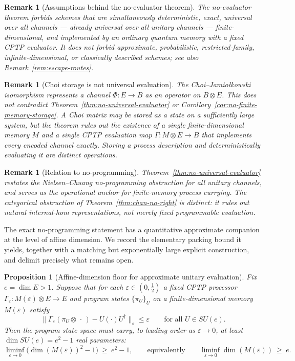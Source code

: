 \documentclass[11pt]{article}
\newtheorem{proposition}[theorem]{Proposition}
\newtheorem{remark}[theorem]{Remark}
\begin{document}
\begin{remark}[Assumptions behind the no-evaluator theorem]
\label{rem:assumptions-no-evaluator}
The no-evaluator theorem forbids schemes that are simultaneously
deterministic, exact, universal over all channels --- already universal over
all unitary channels --- finite-dimensional, and implemented by an ordinary
quantum memory with a fixed CPTP evaluator. It does not forbid approximate,
probabilistic, restricted-family, infinite-dimensional, or classically
described schemes; see also Remark~\ref{rem:escape-routes}.
\end{remark}

\begin{remark}[Choi storage is not universal evaluation]
\label{rem:choi-not-evaluation}
The Choi--Jamio\l{}kowski isomorphism represents a channel $\Phi:E\to B$ as
an operator on $B\otimes E$. This does not contradict
Theorem~\ref{thm:no-universal-evaluator} or
Corollary~\ref{cor:no-finite-memory-storage}. A Choi matrix may be stored as
a state on a sufficiently large system, but the theorem rules out the
existence of a single finite-dimensional memory $M$ and a single CPTP
evaluation map $\Gamma:M\otimes E\to B$ that implements every encoded channel
exactly. Storing a process description and deterministically evaluating it
are distinct operations.
\end{remark}

\begin{remark}[Relation to no-programming]
\label{rem:no-programming}
Theorem~\ref{thm:no-universal-evaluator} restates the
Nielsen--Chuang no-programming obstruction
\cite{NielsenChuang1997} for all unitary channels, and serves as
the operational anchor for finite-memory process currying. The categorical
obstruction of Theorem~\ref{thm:chan-no-right} is distinct: it rules out
natural internal-hom representations, not merely fixed programmable
evaluation.
\end{remark}

The exact no-programming statement has a quantitative approximate companion at
the level of affine dimension. We record the elementary packing bound it yields,
together with a matching but exponentially large explicit construction, and
delimit precisely what remains open.

\begin{proposition}[Affine-dimension floor for approximate unitary evaluation]
\label{prop:approx-memory-floor}
Fix $e=\dim E>1$. Suppose that for each $\varepsilon\in(0,\tfrac12)$ a fixed
CPTP processor $\Gamma_\varepsilon:M(\varepsilon)\otimes E\to E$ and program
states $\{\pi_U\}_{U}$ on a finite-dimensional memory $M(\varepsilon)$ satisfy
\[
\bigl\|\Gamma_\varepsilon(\pi_U\otimes\,\cdot\,)-U(\cdot)U^\dagger\bigr\|_\diamond
\le\varepsilon
\qquad\text{for all }U\in SU(e).
\]
Then the program state space must carry, to leading order as
$\varepsilon\to0$, at least $\dim SU(e)=e^2-1$ real parameters:
\[
\liminf_{\varepsilon\to0}\bigl(\dim(M(\varepsilon))^2-1\bigr)\ \ge\ e^2-1,
\qquad\text{equivalently}\qquad
\liminf_{\varepsilon\to0}\dim(M(\varepsilon))\ \ge\ e .
\]
\end{proposition}
\end{document}
